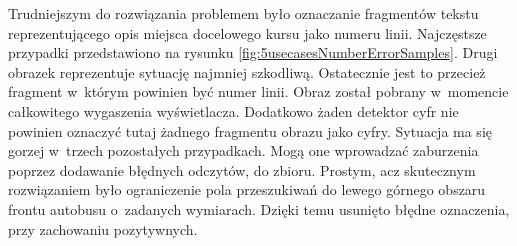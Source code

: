 Trudniejszym do rozwiązania problemem było oznaczanie fragmentów 
tekstu reprezentującego opis miejsca docelowego kursu jako numeru
linii. Najczęstsze przypadki 
przedstawiono na rysunku \ref{fig:5usecasesNumberErrorSamples}.
Drugi obrazek reprezentuje sytuację najmniej szkodliwą. 
Ostatecznie jest to przecież fragment w~którym powinien
być numer linii. Obraz został pobrany w~momencie całkowitego
wygaszenia wyświetlacza. Dodatkowo żaden detektor cyfr nie powinien 
oznaczyć tutaj żadnego fragmentu obrazu jako cyfry. Sytuacja ma się gorzej
w~trzech pozostałych przypadkach. Mogą one wprowadzać zaburzenia poprzez dodawanie
błędnych odczytów, do zbioru. Prostym, acz skutecznym rozwiązaniem było ograniczenie
pola przeszukiwań do lewego górnego obszaru frontu autobusu
o~zadanych wymiarach. Dzięki temu usunięto błędne
oznaczenia, przy zachowaniu pozytywnych.


